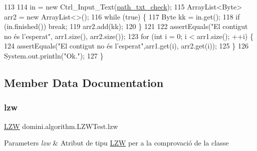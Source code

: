 \begin{DoxyCode}
113 
114         in = \textcolor{keyword}{new} Ctrl\_Input\_Text(\hyperlink{classdomini_1_1algorithm_1_1LZWTest_add9dbf2d86413bf9f7bcdd23b268c288}{path\_txt\_check});
115         ArrayList<Byte> arr2 = \textcolor{keyword}{new} ArrayList<>();
116         \textcolor{keywordflow}{while} (\textcolor{keyword}{true}) \{
117             Byte kk = in.get();
118             \textcolor{keywordflow}{if} (in.finished()) \textcolor{keywordflow}{break};
119             arr2.add(kk);
120         \}
121         
122         assertEquals(\textcolor{stringliteral}{"El contigut no és l'esperat"}, arr1.size(), arr2.size());
123         \textcolor{keywordflow}{for} (\textcolor{keywordtype}{int} i = 0; i < arr1.size(); ++i) \{
124             assertEquals(\textcolor{stringliteral}{"El contigut no és l'esperat"},arr1.get(i), arr2.get(i));
125         \}
126         System.out.println(\textcolor{stringliteral}{"Ok."});
127     \}
\end{DoxyCode}


\subsection{Member Data Documentation}
\mbox{\label{classdomini_1_1algorithm_1_1LZWTest_a591c1bb9b927631d0e60a2853e502d20}} 
\subsubsection{\texorpdfstring{lzw}{lzw}}
{\footnotesize\ttfamily \hyperlink{classdomini_1_1algorithm_1_1LZW}{L\+ZW} domini.\+algorithm.\+L\+Z\+W\+Test.\+lzw\hspace{0.3cm}{\ttfamily [private]}}


\begin{DoxyParams}{Parameters}
{\em lzw} & Atribut de tipu \hyperlink{classdomini_1_1algorithm_1_1LZW}{L\+ZW} per a la comprovació de la classe \\
\hline
\end{DoxyParams}
\mbox{\label{classdomini_1_1algorithm_1_1LZWTest_af5091e6df88845c585e92165f2fae2dc}} 
